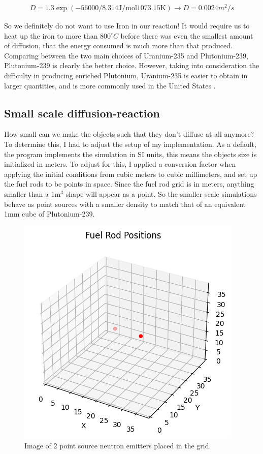\documentclass[letterpaper, 12pt]{article}
\begin{document}
         \begin{align}
            D = 1.3\exp(-56000 / 8.314 \text{J/mol} 1073.15 \text{K}) \longrightarrow D = 0.0024 m^2/s
         \end{align}

         So we definitely do not want to use Iron in our reaction! It would require us to heat up the iron to more than $800^\circ C$ before there was even the smallest amount of diffusion, that the energy consumed is much more than that produced. \\

         Comparing between the two main choices of Uranium-235 and Plutonium-239, Plutonium-239 is clearly the better choice. However, taking into consideration the difficulty in producing enriched Plutonium, Uranium-235 is easier to obtain in larger quantities, and is more commonly used in the United States \cite{What-is-Plutonium?}.
      \subsection{Small scale diffusion-reaction}
         How small can we make the objects such that they don't diffuse at all anymore? To determine this, I had to adjust the setup of my implementation. As a default, the program implements the simulation in SI units, this means the objects size is initialized in meters. To adjust for this, I applied a conversion factor when applying the initial conditions from cubic meters to cubic millimeters, and set up the fuel rods to be points in space. Since the fuel rod grid is in meters, anything smaller than a 1m$^3$ shape will appear as a point. So the smaller scale simulations behave as point sources with a smaller density to match that of an equivalent 1mm cube of Plutonium-239. 

         \begin{figure}[h!]
            \centering
            \includegraphics[width=0.4\linewidth]{Graphs/Small-Simulation.png}
            \caption{Image of 2 point source neutron emitters placed in the grid.}
            \label{img:Small Objects in Grid}
         \end{figure}
\end{document}
